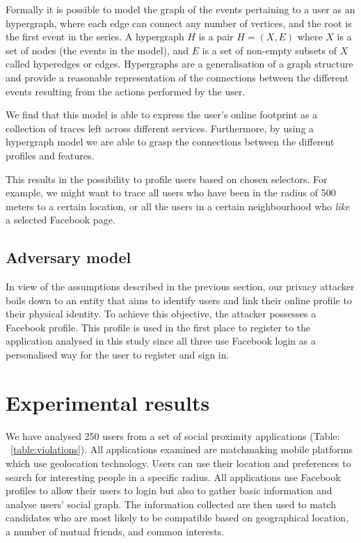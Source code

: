 Formally it is possible to model the graph of the events pertaining to a user as an hypergraph, where each edge can connect any number of vertices, and the root is the first event in the series.  A hypergraph $H$ is a pair $H = (X,E)$ where $X$ is a set of nodes (the events in the model), and $E$ is a set of non-­empty subsets of $X$ called hyperedges or edges. Hypergraphs are a generalisation of a graph structure and provide a reasonable representation of the connections between the different events resulting from the actions performed by the user.

We find that this model is able to express the user's online footprint as a collection of traces left across different services. Furthermore, by using a hypergraph model we are able to grasp the connections between the different profiles and features.

This results in the possibility to profile users based on chosen selectors. For example, we might want to trace all users who have been in the radius of 500 meters to a certain location, or all the users in a certain neighbourhood who \emph{like} a selected Facebook page.

\subsection{Adversary model}

In view of the assumptions described in the previous section, our privacy attacker boils down to an entity that aims to identify users and link their online profile to their physical identity. To achieve this objective, the attacker possesses a Facebook profile. This profile is used in the first place to register to the application analysed in this study since all three use Facebook login as a personalised way for the user to register and sign in.

\section{Experimental results}
\label{sec:exp-results}
\noindent
We have analysed 250 users from a set of social proximity applications (Table: ~\ref{table:violations}). All applications examined are matchmaking mobile platforms which use geolocation technology. Users can use their location and preferences to search for interesting people in a specific radius. All applications use Facebook profiles to allow their users to login but also to gather basic information and analyse users' social graph. The information collected are then used to match candidates who are most likely to be compatible based on geographical location, a number of mutual friends, and common interests.


